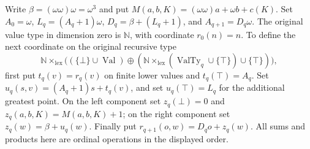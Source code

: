 \begin{definition}
\label{hir:disjoint-invariant-ordinal-code}
\leanok
Write $\beta=(\omega\omega)\omega=\omega^3$ and put
$M(a,b,K)=(\omega\omega)a+\omega b+c(K)$.
Set $A_0=\omega$, $L_q=(A_q+1)\omega$,
$D_q=\beta+(L_q+1)$, and $A_{q+1}=D_q\omega$.
The original value type in dimension zero is $\mathbb N$, with coordinate
$r_0(n)=n$. To define the next coordinate on the original recursive type
\[
\mathbb N\times_{\mathrm{lex}}
\bigl((\{\bot\}\cup\operatorname{Val})\mathbin{\oplus}
(\mathbb N\times_{\mathrm{lex}}(\operatorname{ValTy}_q\cup\{\top\})
\cup\{\top\})\bigr),
\]
first put $t_q(v)=r_q(v)$ on finite lower values and $t_q(\top)=A_q$.
Set $u_q(s,v)=(A_q+1)s+t_q(v)$, and set $u_q(\top)=L_q$ for the
additional greatest point. On the left component set
$z_q(\bot)=0$ and $z_q(a,b,K)=M(a,b,K)+1$; on the right component set
$z_q(w)=\beta+u_q(w)$. Finally put
$r_{q+1}(o,w)=D_qo+z_q(w)$.
All sums and products here are ordinal operations in the displayed order.
\end{definition}

